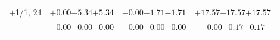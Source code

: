 \documentclass[compress]{beamer}
\begin{document}
\begin{frame}
\begin{tabular}{r | c | c | c}
$+$1/1, 24 & $+0.00$\hspace{0.1 cm}$+5.34$\hspace{0.1 cm}\textcolor{black}{$+5.34$} & $-0.00$\hspace{0.1 cm}$-1.71$\hspace{0.1 cm}\textcolor{black}{$-1.71$} & $+17.57$\hspace{0.1 cm}$+17.57$\hspace{0.1 cm}\textcolor{black}{$+17.57$} \\
           & $-0.00$\hspace{0.1 cm}$-0.00$\hspace{0.1 cm}\textcolor{black}{$-0.00$} & $-0.00$\hspace{0.1 cm}$-0.00$\hspace{0.1 cm}\textcolor{black}{$-0.00$} & $-0.00$\hspace{0.1 cm}$-0.17$\hspace{0.1 cm}\textcolor{black}{$-0.17$} \\
\end{tabular}
\end{frame}
\end{document}
